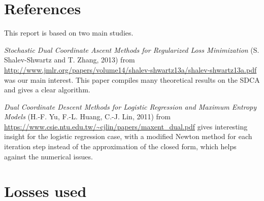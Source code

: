 \documentclass{article}
\begin{document}
\section*{References}


This report is based on two main studies.

\textit{Stochastic Dual Coordinate Ascent Methods for Regularized Loss Minimization} 
(S. Shalev-Shwartz and T. Zhang, 2013)
from \url{http://www.jmlr.org/papers/volume14/shalev-shwartz13a/shalev-shwartz13a.pdf}
was our main interest. This paper compiles many theoretical results on the SDCA and gives a clear algorithm.

\textit{Dual Coordinate Descent Methods for Logistic Regression and Maximum Entropy Models} 
(H.-F. Yu, F.-L. Huang, C.-J. Lin, 2011) 
from \url{https://www.csie.ntu.edu.tw/~cjlin/papers/maxent_dual.pdf}
gives interesting insight for the logistic regression case, with a modified Newton method 
for each iteration step instead of the approximation of the closed form, which helps against 
the numerical issues.


\newpage
\appendix


\section{Losses used}
\label{appendix-losses}
\end{document}
